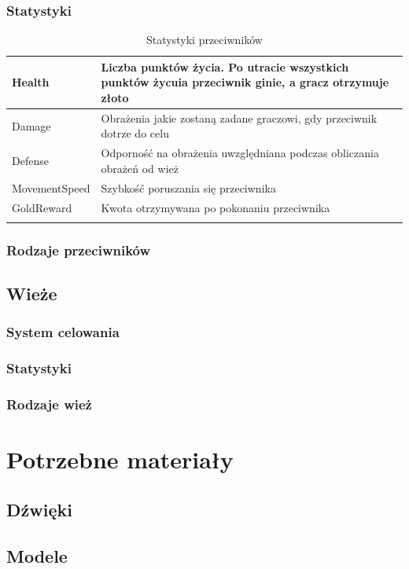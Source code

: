 \documentclass[a4paper,12pt, twoside, titlepage]{article}
\begin{document}
\subsubsection{Statystyki}
\begin{center}
\begin{longtable}{| p{} | p{} |} 
	\hline
	Health
	& Liczba punktów życia. Po utracie wszystkich punktów życuia przeciwnik ginie, a gracz otrzymuje złoto \\
	\hline
	Damage
	& Obrażenia jakie zostaną zadane graczowi, gdy przeciwnik dotrze do celu \\ 
	\hline 
	Defense
	& Odporność na obrażenia uwzględniana podczas obliczania obrażeń od wież \\ 
	\hline
	MovementSpeed
	& Szybkość poruszania się przeciwnika \\ 
	\hline
	GoldReward
	& Kwota otrzymywana po pokonaniu przeciwnika \\ 
	\hline

	\caption{Statystyki przeciwników}	
\end{longtable}
\end{center}

\subsubsection{Rodzaje przeciwników}
\subsection{Wieże}
\subsubsection{System celowania}
\subsubsection{Statystyki}
\subsubsection{Rodzaje wież}
 
\newpage
\section{Potrzebne materiały}
\subsection{Dźwięki}
\subsection{Modele}
\end{document}
